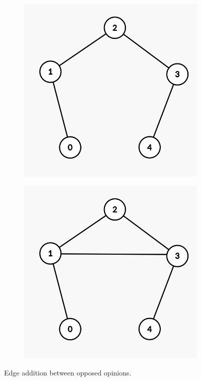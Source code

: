 \begin{figure}[h]
	\centering
	\begin{subfigure}[t]{0.3\textwidth}
		\centering
		\includegraphics[height=0.15\textheight]{Figures/p5A}
		\caption{}
		\label{subfig:monotonicityA}
	\end{subfigure}
	\hfill
	\begin{subfigure}[t]{0.3\textwidth}
		\centering
		\includegraphics[height=0.15\textheight]{Figures/p5B}
		\caption{}
		\label{subfig:monotonicityB}
	\end{subfigure}
	\vspace{40pt}
	\hfill
	\caption{Edge addition between opposed opinions.}
	\label{fig:p5}
\end{figure}
\\
\\

